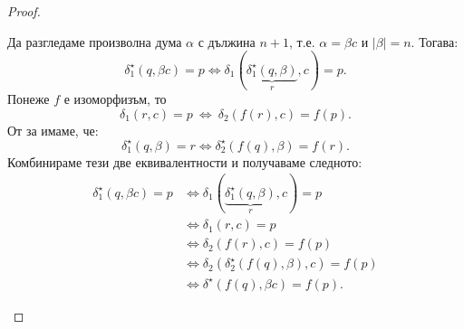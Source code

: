 \begin{proof}
\begin{itemize}
{      
    }
    Да разгледаме произволна дума $\alpha$ с дължина $n+1$, т.е. $\alpha = \beta c$ и $|\beta| = n$. Тогава:
    \[\delta^\star_1(q,\beta c) = p \iff \delta_1(\underbrace{\delta^\star_1(q,\beta)}_{r}, c) = p.\]
    Понеже $f$ е изоморфизъм, то
    \[\delta_1(r,c) = p\ \iff\ \delta_2(f(r),c) = f(p).\]
    От \IndHyp за  имаме, че:
    \[\delta^\star_1(q,\beta) = r \iff \delta^\star_2(f(q),\beta) = f(r).\]
    Комбинираме тези две еквивалентности и получаваме следното:
    \begin{align*}
      \delta^\star_1(q,\beta c) = p & \iff \delta_1(\underbrace{\delta^\star_1(q,\beta)}_{r}, c) = p\\
                                    & \iff \delta_1(r,c) = p\\
                                    & \iff \delta_2(f(r),c) = f(p)\\
                                    & \iff \delta_2(\delta^\star_2(f(q),\beta),c) = f(p)\\
                                    & \iff \delta^\star(f(q),\beta c) = f(p).
    \end{align*}
    

    
  \end{itemize}
\end{proof}

